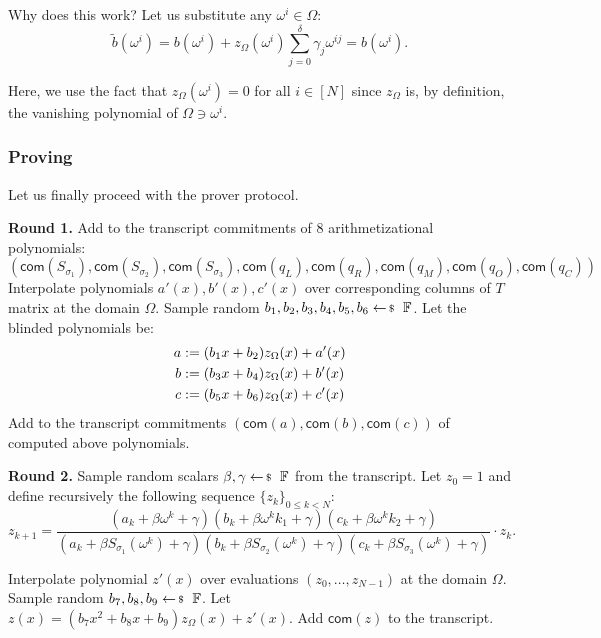 \documentclass[../lecture-notes-148x210.tex]{subfiles}
\begin{document}
Why does this work? Let us substitute any $\omega^i \in \Omega$:
\begin{equation*}
    \widetilde{b}(\omega^i) = b(\omega^i) + z_{\Omega}(\omega^i)\sum_{j=0}^{\delta}\gamma_j\omega^{ij} = b(\omega^i).
\end{equation*}

Here, we use the fact that $z_{\Omega}(\omega^i) = 0$ for all $i \in [N]$ since $z_{\Omega}$ is, 
by definition, the vanishing polynomial of $\Omega \ni \omega^i$.

\subsubsection{Proving}
Let us finally proceed with the prover protocol.

\textcolor{green!60!black}{\textbf{Round 1.}} Add to the transcript commitments
of 8 arithmetizational polynomials:
\begin{equation*}
    (\mathsf{com}(S_{\sigma_1}), \mathsf{com}(S_{\sigma_2}), \mathsf{com}(S_{\sigma_3}), \mathsf{com}(q_L), \mathsf{com}(q_R), \mathsf{com}(q_M), \mathsf{com}(q_O), \mathsf{com}(q_C))
\end{equation*}
Interpolate polynomials $a'(x), b'(x), c'(x)$ over corresponding columns of $T$ matrix at
the domain $\Omega$. Sample random $b_1, b_2, b_3, b_4, b_5, b_6 \leftarrowS
\mathbb{F}$. Let the blinded polynomials be:
\begin{align*}
\centering
a &:= (b_1 x + b_2)z_{\Omega}(x) + a'(x) \\
b &:= (b_3 x + b_4)z_{\Omega}(x) + b'(x) \\
c &:= (b_5 x + b_6)z_{\Omega}(x) + c'(x)
\end{align*}
Add to the transcript commitments $(\mathsf{com}(a), \mathsf{com}(b),
\mathsf{com}(c))$ of computed above polynomials.

\textcolor{green!60!black}{\textbf{Round 2.}}  Sample random scalars $\beta,
\gamma \leftarrowS \mathbb{F}$ from the transcript. Let $z_0 = 1$ and define
recursively the following sequence $\{z_k\}_{0 \leq k < N}$:
\begin{equation*}
    z_{k+1} = \frac{(a_k + \beta \omega^{k} + \gamma) (b_k + \beta \omega^{k}k_1 + \gamma) (c_k + \beta \omega^{k}k_2 + \gamma)}{(a_k + \beta S_{\sigma_1}(\omega^{k}) + \gamma) (b_k + \beta S_{\sigma_2}(\omega^{k}) + \gamma) (c_k + \beta S_{\sigma_3}(\omega^{k}) + \gamma)} \cdot z_k.
\end{equation*}

Interpolate polynomial $z'(x)$ over evaluations $(z_0, \dots, z_{N-1})$ at the
domain $\Omega$. Sample random $b_7, b_8, b_9 \leftarrowS \mathbb{F}$. Let $z(x)
= (b_7 x^2 + b_8 x + b_9)z_{\Omega}(x) + z'(x)$. Add $\mathsf{com}(z)$ to the transcript.
\end{document}
